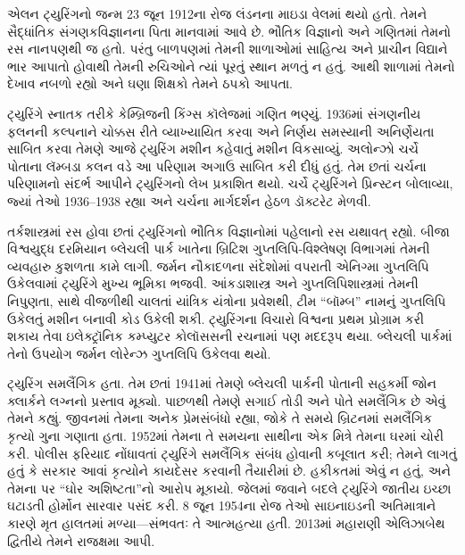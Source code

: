 \begingroup
\makeatletter{}\makeatother


\label{guunit:OLP-0631}




એલન ટ્યુરિંગનો જન્મ 23 જૂન
1912ના રોજ લંડનના માઇડા
વેલમાં થયો હતો. તેમને
સૈદ્ધાંતિક સંગણકવિજ્ઞાનના
પિતા માનવામાં આવે છે.
ભૌતિક વિજ્ઞાનો અને ગણિતમાં
તેમનો રસ નાનપણથી જ હતો.
પરંતુ બાળપણમાં તેમની
શાળાઓમાં સાહિત્ય અને
પ્રાચીન વિદ્યાને ભાર
આપાતો હોવાથી તેમની
રુચિઓને ત્યાં પૂરતું
સ્થાન મળતું ન હતું.
આથી શાળામાં તેમનો
દેખાવ નબળો રહ્યો અને
ઘણા શિક્ષકો તેમને
ઠપકો આપતા.


ટ્યુરિંગે સ્નાતક તરીકે
કેમ્બ્રિજની કિંગ્સ
કૉલેજમાં ગણિત ભણ્યું.
1936માં સંગણનીય
ફલનની કલ્પનાને
ચોક્કસ રીતે વ્યાખ્યાયિત
કરવા અને નિર્ણય
સમસ્યાની અનિર્ણેયતા
સાબિત કરવા તેમણે
આજે ટ્યુરિંગ મશીન
કહેવાતું મશીન વિકસાવ્યું.
અલોન્ઝો ચર્ચે પોતાના
લૅમ્બડા કલન વડે આ
પરિણામ અગાઉ સાબિત
કરી દીધું હતું.
તેમ છતાં ચર્ચના
પરિણામનો સંદર્ભ
આપીને ટ્યુરિંગનો
લેખ પ્રકાશિત થયો.
ચર્ચે ટ્યુરિંગને
પ્રિન્સ્ટન બોલાવ્યા,
જ્યાં તેઓ 1936--1938
રહ્યા અને ચર્ચના
માર્ગદર્શન હેઠળ
ડૉક્ટરેટ મેળવી.

તર્કશાસ્ત્રમાં રસ હોવા
છતાં ટ્યુરિંગનો ભૌતિક
વિજ્ઞાનોમાં પહેલાનો
રસ યથાવત્ રહ્યો.
બીજા વિશ્વયુદ્ધ દરમિયાન
બ્લેચલી પાર્ક ખાતેના
બ્રિટિશ ગુપ્તલિપિ-વિશ્લેષણ
વિભાગમાં તેમની વ્યવહારુ
કુશળતા કામે લાગી.
જર્મન નૌકાદળના
સંદેશોમાં વપરાતી
એનિગ્મા ગુપ્તલિપિ
ઉકેલવામાં ટ્યુરિંગે
મુખ્ય ભૂમિકા ભજવી.
આંકડાશાસ્ત્ર અને
ગુપ્તલિપિશાસ્ત્રમાં
તેમની નિપુણતા,
સાથે વીજળીથી ચાલતાં
યાંત્રિક યંત્રોના પ્રવેશથી,
ટીમ “બૉમ્બ”
નામનું ગુપ્તલિપિ
ઉકેલતું મશીન બનાવી
કોડ ઉકેલી શકી.
ટ્યુરિંગના વિચારો
વિશ્વના પ્રથમ
પ્રોગ્રામ કરી શકાય
તેવા ઇલેક્ટ્રૉનિક
કમ્પ્યુટર કોલૉસસની
રચનામાં પણ મદદરૂપ
થયા. બ્લેચલી
પાર્કમાં તેનો
ઉપયોગ જર્મન
લોરેન્ઝ ગુપ્તલિપિ
ઉકેલવા થયો.

ટ્યુરિંગ સમલૈંગિક
હતા. તેમ છતાં
1941માં તેમણે
બ્લેચલી પાર્કની
પોતાની સહકર્મી
જોન ક્લાર્કને
લગ્નનો પ્રસ્તાવ
મૂક્યો. પાછળથી
તેમણે સગાઈ તોડી
અને પોતે સમલૈંગિક
છે એવું તેમને
કહ્યું. જીવનમાં
તેમના અનેક
પ્રેમસંબંધો રહ્યા,
જોકે તે સમયે
બ્રિટનમાં સમલૈંગિક
કૃત્યો ગુના
ગણાતા હતા.
1952માં તેમના
તે સમયના સાથીના
એક મિત્રે તેમના
ઘરમાં ચોરી કરી.
પોલીસ ફરિયાદ
નોંધાવતાં ટ્યુરિંગે
સમલૈંગિક સંબંધ
હોવાની કબૂલાત
કરી; તેમને
લાગતું હતું કે
સરકાર આવાં
કૃત્યોને કાયદેસર
કરવાની તૈયારીમાં
છે. હકીકતમાં એવું
ન હતું, અને
તેમના પર
“ઘોર અશિષ્ટતા”નો
આરોપ મૂકાયો.
જેલમાં જવાને
બદલે ટ્યુરિંગે
જાતીય ઇચ્છા
ઘટાડતી હોર્મોન
સારવાર પસંદ કરી.
8 જૂન 1954ના
રોજ તેઓ
સાઇનાઇડની
અતિમાત્રાને કારણે
મૃત હાલતમાં
મળ્યા—સંભવતઃ
તે આત્મહત્યા
હતી. 2013માં
મહારાણી એલિઝાબેથ
દ્વિતીયે તેમને
રાજક્ષમા આપી.




